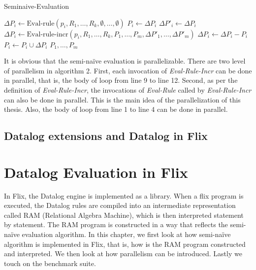 \documentclass[twoside,11pt,openright]{report}
\theoremstyle{definition}
\begin{document}
\begin{algorithm}
  \caption{Seminaive-Evaluation}
  \begin{algorithmic}[1]
    \State $\Delta P_i \leftarrow \text{Eval-rule}(p_i, R_1, \ldots, R_k, \emptyset, \ldots, \emptyset)$
    \State $P_i \leftarrow \Delta P_i$
    \EndFor
    \Repeat
    \State $\Delta P'_i \leftarrow \Delta P_i$
    \EndFor
    \State $\Delta P_i \leftarrow \text{Eval-rule-incr}(p_i, R_1, \ldots, R_k, P_1, \ldots, P_m, \Delta P'_1, \ldots, \Delta P'_m)$
    \State $\Delta P_i \leftarrow \Delta P_i - P_i$
    \EndFor
    \State $P_i \leftarrow P_i \cup \Delta P_i$
    \EndFor
    \State \Return $P_1, \ldots, P_m$
  \end{algorithmic}
\end{algorithm}

It is obvious that the semi-na\"ive evaluation is parallelizable. There are two level of parallelism in algorithm 2.
First, each invocation of \textit{Eval-Rule-Incr} can be done in parallel, that is, the body of loop from line 9 to line 12.
Second, as per the definition of \textit{Eval-Rule-Incr}, the invocations of \textit{Eval-Rule} called by \textit{Eval-Rule-Incr}
can also be done in parallel. This is the main idea of the parallelization of this thesis. Also, the body of loop from line 1 to line 4
can be done in parallel.

\section{Datalog extensions and Datalog in Flix}


\chapter{Datalog Evaluation in Flix}
\label{ch:datalog_evaluation}

In Flix, the Datalog engine is implemented as a library. When a flix program is executed,
the Datalog rules are compiled into an intermediate representation called RAM (Relational Algebra Machine),
which is then interpreted statement by statement. The RAM program is constructed in a way that
reflects the semi-na\"ive evaluation algorithm. In this chapter, we first look at how semi-na\"ive algorithm is
implemented in Flix, that is, how is the RAM program constructed and interpreted.
We then look at how parallelism can be introduced. Lastly we touch on the benchmark suite.
\end{document}
